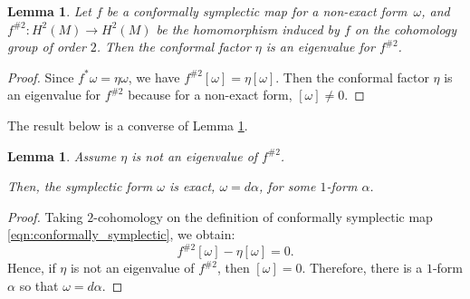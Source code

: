 \documentclass[11pt]{amsart}
\newtheorem{lem}[thm]{Lemma}
\theoremstyle{definition}
\theoremstyle{remark}
\numberwithin{equation}{section}
\begin{document}
\begin{lem}
\label{lem:obstruction}
Let  $f$ be a conformally symplectic map for a non-exact form~$\omega$, and  $f^{\#2} :H^2(M)\to H^2(M)$ be the homomorphism induced by $f$ on the cohomology group of order $2$.
Then the conformal factor $\eta$ is an eigenvalue for $f^{\#2}$.
\end{lem}

\begin{proof}
Since $f^*\omega=\eta\omega$, we have
$f^{\#2} [\omega]=\eta[\omega]$. Then  the conformal factor $\eta$ is an eigenvalue for $f^{\#2}$ because for a non-exact form,  $[\omega]\neq 0$.
\end{proof}


The result  below is a converse of Lemma \ref{lem:obstruction}.


\begin{lem} \label{generating}
  Assume $\eta$ is not an eigenvalue of $f^{\#2}$.

  Then,  the symplectic form $\omega$ is exact, $\omega = d \alpha$, for some $1$-form $\alpha$.
\end{lem}
\begin{proof}
  Taking $2$-cohomology on the definition of conformally symplectic map
  \eqref{eqn:conformally_symplectic},
  we obtain:
  \[
  f^{\#2} [\omega] - \eta [\omega] = 0 .
  \]
  Hence, if $\eta$ is not an eigenvalue of $f^{\#2}$, then
 $[\omega] = 0$. Therefore,  there is a $1$-form
  $\alpha$ so that
$\omega = d \alpha$.
\end{proof}
\end{document}
